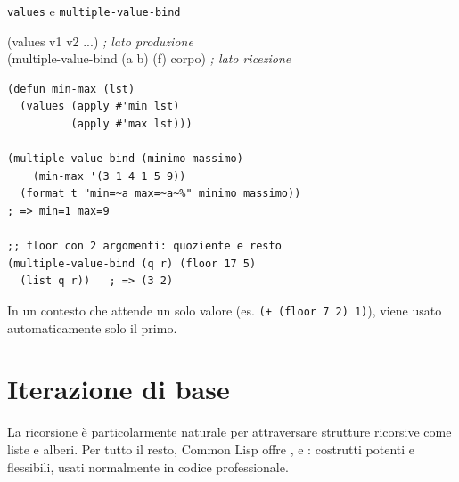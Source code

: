 \seprule


\begin{concetto}{\texttt{values} e \texttt{multiple-value-bind}}

\begin{sintassi}
(values v1 v2 ...)                        \textit{; lato produzione}\\
(multiple-value-bind (a b) (f) corpo)     \textit{; lato ricezione}
\end{sintassi}

\end{concetto}

\begin{esempio}
\begin{lstlisting}
(defun min-max (lst)
  (values (apply #'min lst)
          (apply #'max lst)))

(multiple-value-bind (minimo massimo)
    (min-max '(3 1 4 1 5 9))
  (format t "min=~a max=~a~%" minimo massimo))
; => min=1 max=9

;; floor con 2 argomenti: quoziente e resto
(multiple-value-bind (q r) (floor 17 5)
  (list q r))   ; => (3 2)
\end{lstlisting}
\end{esempio}

\begin{nota}
In un contesto che attende un solo valore (es. \texttt{(+ (floor 7 2) 1)}),
viene usato automaticamente solo il primo.
\end{nota}

\section{Iterazione di base}

\begin{confronto}
La ricorsione è particolarmente naturale per attraversare strutture
ricorsive come liste e alberi. Per tutto il resto, Common Lisp offre
,  e : costrutti potenti e flessibili,
usati normalmente in codice professionale.
\end{confronto}


